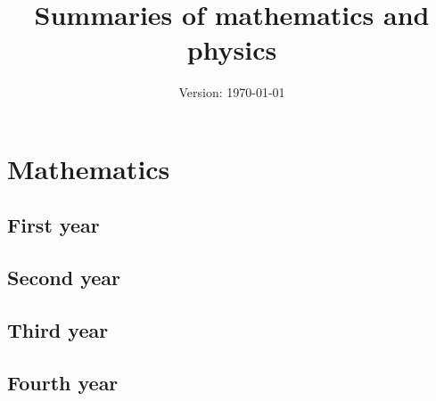 \documentclass{report}
\title{Summaries of mathematics and physics}
\author{}
\date{Version: \today}
\begin{document}
\maketitle
\newpage
\tableofcontents
\newpage
\part{Mathematics}
    \chapter{First year}
    \newpage
        
        \cleardoublepage    
    
        
        \cleardoublepage
        
        
        \cleardoublepage
    \chapter{Second year}
    \newpage
        
        \cleardoublepage
        
        
        \cleardoublepage
        
        
        \cleardoublepage
        
        
        \cleardoublepage

        
        \cleardoublepage

        
        \cleardoublepage
    \chapter{Third year}
    \newpage
        
    \chapter{Fourth year}
    \newpage
%       
        
\end{document}
